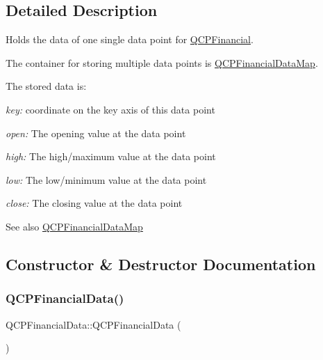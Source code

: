 \subsection{Detailed Description}
Holds the data of one single data point for \mbox{\hyperlink{class_q_c_p_financial}{Q\+C\+P\+Financial}}. 

The container for storing multiple data points is \mbox{\hyperlink{qcustomplot_8h_a745c09823fae0974b50beca9bc3b3d7d}{Q\+C\+P\+Financial\+Data\+Map}}.

The stored data is\+: \begin{DoxyItemize}
\item {\itshape key\+:} coordinate on the key axis of this data point \item {\itshape open\+:} The opening value at the data point \item {\itshape high\+:} The high/maximum value at the data point \item {\itshape low\+:} The low/minimum value at the data point \item {\itshape close\+:} The closing value at the data point\end{DoxyItemize}
\begin{DoxySeeAlso}{See also}
\mbox{\hyperlink{qcustomplot_8h_a745c09823fae0974b50beca9bc3b3d7d}{Q\+C\+P\+Financial\+Data\+Map}} 
\end{DoxySeeAlso}


\subsection{Constructor \& Destructor Documentation}
\mbox{\label{class_q_c_p_financial_data_a1ca53b3a9ae4e9658a4fd1ca57d76ba4}} 
\subsubsection{\texorpdfstring{Q\+C\+P\+Financial\+Data()}{QCPFinancialData()}\hspace{0.1cm}{\footnotesize\ttfamily [1/2]}}
{\footnotesize\ttfamily Q\+C\+P\+Financial\+Data\+::\+Q\+C\+P\+Financial\+Data (\begin{DoxyParamCaption}{ }\end{DoxyParamCaption})}

